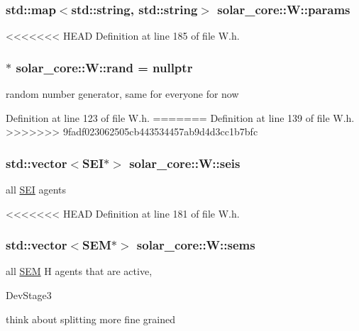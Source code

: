 \subsubsection[{params}]{\setlength{\rightskip}{0pt plus 5cm}std\+::map$<$std\+::string, std\+::string$>$ solar\+\_\+core\+::\+W\+::params\hspace{0.3cm}{\ttfamily [protected]}}\label{classsolar__core_1_1_w_a0d06bc7242f8b3958986118eb217583f}


<<<<<<< HEAD
Definition at line 185 of file W.\+h.

\hypertarget{classsolar__core_1_1_w_aa60afb55012cd72e304ac2c133e5a245}{}
\subsubsection[{rand}]{$\ast$ solar\+\_\+core\+::\+W\+::rand = nullptr}\label{classsolar__core_1_1_w_aa60afb55012cd72e304ac2c133e5a245}
random number generator, same for everyone for now 

Definition at line 123 of file W.\+h.
=======
Definition at line 139 of file W.\+h.
>>>>>>> 9fadf023062505cb443534457ab9d4d3cc1b7bfc

\hypertarget{classsolar__core_1_1_w_a311baa30390494ae8e79f26e372e716d}{}
\subsubsection[{seis}]{\setlength{\rightskip}{0pt plus 5cm}std\+::vector$<${\bf S\+E\+I}$\ast$$>$ solar\+\_\+core\+::\+W\+::seis\hspace{0.3cm}{\ttfamily [protected]}}\label{classsolar__core_1_1_w_a311baa30390494ae8e79f26e372e716d}
all \hyperlink{classsolar__core_1_1_s_e_i}{S\+E\+I} agents 

<<<<<<< HEAD
Definition at line 181 of file W.\+h.

\hypertarget{classsolar__core_1_1_w_ab6349cbc751747a05618dad4ebb1b726}{}
\subsubsection[{sems}]{\setlength{\rightskip}{0pt plus 5cm}std\+::vector$<${\bf S\+E\+M}$\ast$$>$ solar\+\_\+core\+::\+W\+::sems\hspace{0.3cm}{\ttfamily [protected]}}\label{classsolar__core_1_1_w_ab6349cbc751747a05618dad4ebb1b726}
all \hyperlink{classsolar__core_1_1_s_e_m}{S\+E\+M} H agents that are active,\begin{DoxyRefDesc}{Dev\+Stage3}
\item[\hyperlink{_dev_stage3__DevStage3000006}{Dev\+Stage3}]think about splitting more fine grained \end{DoxyRefDesc}


